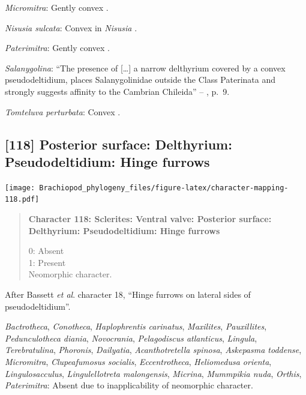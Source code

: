 \documentclass[openany]{book}
\begin{document}
\hypertarget{Micromitra-coding-117}{}
\emph{Micromitra}: Gently convex \citep[see][fig.
83.3]{Williams2000LinguliformeaCraniiformea}.

\hypertarget{Nisusia_sulcata-coding-117}{}
\emph{Nisusia sulcata}: Convex in \emph{Nisusia} \citep[see][fig.
8.4]{Rowell1985Theevolutionary}.

\hypertarget{Paterimitra-coding-117}{}
\emph{Paterimitra}: Gently convex \citep[see][fig.
83.1]{Williams2000LinguliformeaCraniiformea}.

\hypertarget{Salanygolina-coding-117}{}
\emph{Salanygolina}: ``The presence of {[}\ldots{}{]} a narrow
delthyrium covered by a convex pseudodeltidium, places Salanygolinidae
outside the Class Paterinata and strongly suggests affinity to the
Cambrian Chileida'' -- \citet{Holmer2009Theenigmatic}, p.~9.

\hypertarget{Tomteluva_perturbata-coding-117}{}
\emph{Tomteluva perturbata}: Convex \citep{Streng2016Anew}.

\subsection*{{[}118{]} Posterior surface: Delthyrium: Pseudodeltidium:
Hinge
furrows}\label{posterior-surface-delthyrium-pseudodeltidium-hinge-furrows}

\texttt{[image: Brachiopod\_phylogeny\_files/figure-latex/character-mapping-118.pdf]}

\begin{quote}
\textbf{Character 118: Sclerites: Ventral valve: Posterior surface:
Delthyrium: Pseudodeltidium: Hinge furrows}

0: Absent\\
1: Present\\
Neomorphic character.
\end{quote}

After Bassett \emph{et al}.
\citeyearpar{Bassett2001Functionalmorphology} character 18, ``Hinge
furrows on lateral sides of pseudodeltidium''.

\hypertarget{Acanthotretella_spinosa-coding-118}{}
\emph{Bactrotheca}, \emph{Conotheca}, \emph{Haplophrentis carinatus},
\emph{Maxilites}, \emph{Pauxillites}, \emph{Pedunculotheca diania},
\emph{Novocrania}, \emph{Pelagodiscus atlanticus}, \emph{Lingula},
\emph{Terebratulina}, \emph{Phoronis}, \emph{Dailyatia},
\emph{Acanthotretella spinosa}, \emph{Askepasma toddense},
\emph{Micromitra}, \emph{Clupeafumosus socialis}, \emph{Eccentrotheca},
\emph{Heliomedusa orienta}, \emph{Lingulosacculus},
\emph{Lingulellotreta malongensis}, \emph{Micrina}, \emph{Mummpikia
nuda}, \emph{Orthis}, \emph{Paterimitra}: Absent due to inapplicability
of neomorphic character.
\end{document}
